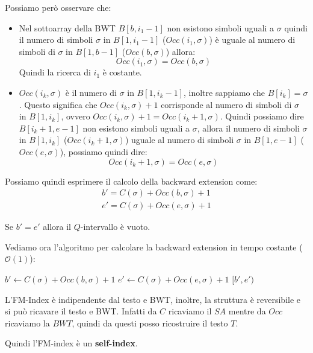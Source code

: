 Possiamo però osservare che:
\begin{itemize}
    \item Nel sottoarray della BWT $B[b,i_1-1]$ non esistono simboli uguali a $\sigma$ quindi il numero
          di simboli $\sigma$ in $B[1,i_1-1]$ ($Occ(i_1,\sigma)$) è uguale al numero
          di simboli di $\sigma$  in $B[1,b-1]$ ($Occ(b,\sigma)$) allora:
          \begin{equation}
              Occ(i_1,\sigma) = Occ(b,\sigma)
          \end{equation}
          Quindi la ricerca di $i_1$ è costante.
    \item $Occ(i_k,\sigma)$ è il numero di $\sigma$ in $B[1,i_k-1]$, inoltre
          sappiamo che $B[i_k]=\sigma$. Questo significa che $Occ(i_k,\sigma) + 1 $ 
          corrisponde al numero di simboli di $\sigma$ in $B[1,i_k]$, ovvero 
          $ Occ(i_k ,\sigma)+1= Occ(i_k + 1,\sigma)$.
          Quindi possiamo dire $B[i_k + 1, e - 1]$ non esistono simboli uguali a $\sigma$,
          allora il numero di simboli $\sigma$ in $B[1, i_k]$ ($Occ(i_k + 1,
              \sigma)$) uguale al numero di simboli $\sigma$ in $B[1, e - 1]$ ($ Occ(e, \sigma)$),
          possiamo quindi dire:
          \begin{equation}
              Occ(i_k + 1, \sigma) = Occ(e, \sigma)
          \end{equation}
\end{itemize}
Possiamo quindi esprimere il calcolo della backward extension come:
\begin{equation}
    \begin{array}{c}
        b' = C(\sigma) + Occ(b, \sigma) + 1 \\
        e' = C(\sigma) + Occ(e, \sigma) + 1
    \end{array}
\end{equation}
\begin{nota}
    Se $b' = e'$ allora il $Q$-intervallo è vuoto.
\end{nota}
Vediamo ora l'algoritmo per calcolare la backward extension in tempo costante
($\mathcal{O}(1)$):
\begin{algorithm}
    \begin{algorithmic}
        \State $b' \gets C(\sigma) + Occ(b, \sigma) + 1$
        \State $e' \gets C(\sigma) + Occ(e, \sigma) + 1$
        \State \Return $[b', e')$
        \EndFunction
    \end{algorithmic}
\end{algorithm}
\begin{nota}
    L'FM-Index è indipendente dal testo e BWT, inoltre, la struttura è reversibile
    e si può ricavare il testo e BWT. Infatti da $C$ ricaviamo il $SA$ mentre da $Occ$
    ricaviamo la $BWT$, quindi da questi posso ricostruire il testo $T$.

    Quindi l'FM-index è un \textbf{self-index}.
\end{nota}

